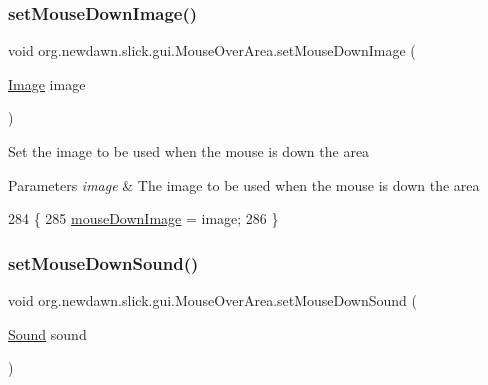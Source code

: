 \subsubsection{\texorpdfstring{set\+Mouse\+Down\+Image()}{setMouseDownImage()}}
{\footnotesize\ttfamily void org.\+newdawn.\+slick.\+gui.\+Mouse\+Over\+Area.\+set\+Mouse\+Down\+Image (\begin{DoxyParamCaption}\item[{\mbox{\hyperlink{classorg_1_1newdawn_1_1slick_1_1_image}{Image}}}]{image }\end{DoxyParamCaption})\hspace{0.3cm}{\ttfamily [inline]}}

Set the image to be used when the mouse is down the area


\begin{DoxyParams}{Parameters}
{\em image} & The image to be used when the mouse is down the area \\
\hline
\end{DoxyParams}

\begin{DoxyCode}
284                                                \{
285         \mbox{\hyperlink{classorg_1_1newdawn_1_1slick_1_1gui_1_1_mouse_over_area_a4ad5a0f6922e09e589f4d3cd2a446109}{mouseDownImage}} = image;
286     \}
\end{DoxyCode}
\mbox{\label{classorg_1_1newdawn_1_1slick_1_1gui_1_1_mouse_over_area_a3a2b109241fbb8d32eb3a1ea036f2daa}} 
\subsubsection{\texorpdfstring{set\+Mouse\+Down\+Sound()}{setMouseDownSound()}}
{\footnotesize\ttfamily void org.\+newdawn.\+slick.\+gui.\+Mouse\+Over\+Area.\+set\+Mouse\+Down\+Sound (\begin{DoxyParamCaption}\item[{\mbox{\hyperlink{classorg_1_1newdawn_1_1slick_1_1_sound}{Sound}}}]{sound }\end{DoxyParamCaption})\hspace{0.3cm}{\ttfamily [inline]}}

